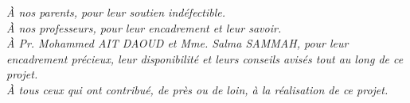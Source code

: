 \newpage
\thispagestyle{empty}
\vspace*{\fill}
\begin{center}
    \textit{À nos parents, pour leur soutien indéfectible.}\\[0.5cm]
    \textit{À nos professeurs, pour leur encadrement et leur savoir.}\\[0.5cm]
    \textit{À Pr. Mohammed AIT DAOUD et Mme. Salma SAMMAH, pour leur encadrement précieux, leur disponibilité et leurs conseils avisés tout au long de ce projet.}\\[0.5cm]
    \textit{À tous ceux qui ont contribué, de près ou de loin, à la réalisation de ce projet.}
\end{center}
\vspace*{\fill}
